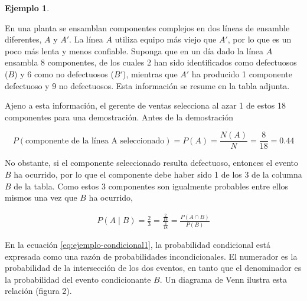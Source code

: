 \documentclass[
  11pt,
]{book}
\theoremstyle{definition}
\theoremstyle{definition}
\newtheorem{example}{Ejemplo}[chapter]
\theoremstyle{definition}
\theoremstyle{definition}
\theoremstyle{remark}
\begin{document}
\begin{example}
\protect\hypertarget{exm:introduccion-probabilidad-condicional}{}\label{exm:introduccion-probabilidad-condicional}

En una planta se ensamblan componentes complejos en dos líneas de ensamble diferentes, \(A\) y \(A'\). La línea \(A\) utiliza equipo más viejo que \(A'\), por lo que es un poco más lenta y menos confiable. Suponga que en un día dado la línea \(A\) ensambla 8 componentes, de los cuales 2 han sido identificados como defectuosos (\(B\)) y 6 como no defectuosos (\(B'\)), mientras que \(A'\) ha producido 1 componente defectuoso y 9 no defectuosos. Esta información se resume en la tabla adjunta.

\begin{table}[H]
\centering
{}
\end{table}

Ajeno a esta información, el gerente de ventas selecciona al azar 1 de estos 18 componentes para una demostración. Antes de la demostración

\[
P(\text{componente de la línea A seleccionado}) = P(A) = \frac{N(A)}{N} = \frac{8}{18} = 0.44
\]

No obstante, si el componente seleccionado resulta defectuoso, entonces el evento \(B\) ha ocurrido, por lo que el componente debe haber sido 1 de los 3 de la columna \(B\) de la tabla. Como estos 3 componentes son igualmente probables entre ellos mismos una vez que \(B\) ha ocurrido,

\begin{equation}
\begin{split}
P(A \mid B) = \frac{2}{3} = \frac{\frac{2}{18}}{\frac{3}{18}} = \frac{P(A \cap B)}{P(B)}
\end{split}
\label{eq:ejemplo-condicional1}
\end{equation}

\end{example}

En la ecuación \eqref{eq:ejemplo-condicional1}, la probabilidad condicional está expresada como una razón de probabilidades incondicionales. El numerador es la probabilidad de la intersección de los dos eventos, en tanto que el denominador es la probabilidad del evento condicionante \(B\). Un diagrama de Venn ilustra esta relación (figura 2).
\end{document}
